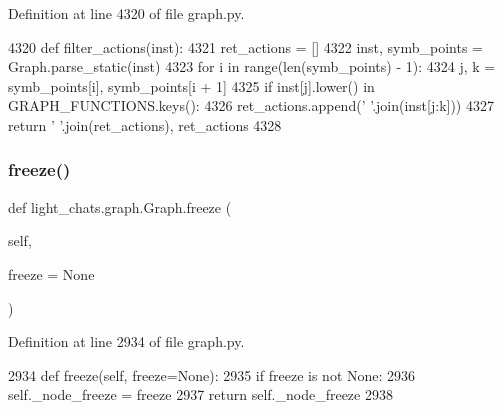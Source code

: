 Definition at line 4320 of file graph.\+py.


\begin{DoxyCode}
4320     \textcolor{keyword}{def }filter\_actions(inst):
4321         ret\_actions = []
4322         inst, symb\_points = Graph.parse\_static(inst)
4323         \textcolor{keywordflow}{for} i \textcolor{keywordflow}{in} range(len(symb\_points) - 1):
4324             j, k = symb\_points[i], symb\_points[i + 1]
4325             \textcolor{keywordflow}{if} inst[j].lower() \textcolor{keywordflow}{in} GRAPH\_FUNCTIONS.keys():
4326                 ret\_actions.append(\textcolor{stringliteral}{' '}.join(inst[j:k]))
4327         \textcolor{keywordflow}{return} \textcolor{stringliteral}{' '}.join(ret\_actions), ret\_actions
4328 
\end{DoxyCode}
\mbox{\label{classlight__chats_1_1graph_1_1Graph_aa61c4fbc35d423277f0755cd8a16a43f}} 
\subsubsection{\texorpdfstring{freeze()}{freeze()}}
{\footnotesize\ttfamily def light\+\_\+chats.\+graph.\+Graph.\+freeze (\begin{DoxyParamCaption}\item[{}]{self,  }\item[{}]{freeze = {\ttfamily None} }\end{DoxyParamCaption})}



Definition at line 2934 of file graph.\+py.


\begin{DoxyCode}
2934     \textcolor{keyword}{def }freeze(self, freeze=None):
2935         \textcolor{keywordflow}{if} freeze \textcolor{keywordflow}{is} \textcolor{keywordflow}{not} \textcolor{keywordtype}{None}:
2936             self.\_node\_freeze = freeze
2937         \textcolor{keywordflow}{return} self.\_node\_freeze
2938 
\end{DoxyCode}
\mbox{\label{classlight__chats_1_1graph_1_1Graph_ac6f61220197d0eb8314fb98f6dd6f135}} 
